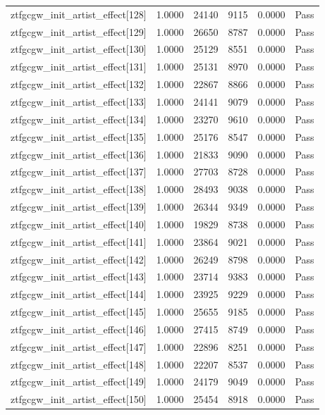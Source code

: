 \begin{table}[htbp]
\begin{tabular}{llrrll}
ztfgcgw\_init\_artist\_effect[128] & 1.0000 & 24140 & 9115 & 0.0000 & Pass \\
ztfgcgw\_init\_artist\_effect[129] & 1.0000 & 26650 & 8787 & 0.0000 & Pass \\
ztfgcgw\_init\_artist\_effect[130] & 1.0000 & 25129 & 8551 & 0.0000 & Pass \\
ztfgcgw\_init\_artist\_effect[131] & 1.0000 & 25131 & 8970 & 0.0000 & Pass \\
ztfgcgw\_init\_artist\_effect[132] & 1.0000 & 22867 & 8866 & 0.0000 & Pass \\
ztfgcgw\_init\_artist\_effect[133] & 1.0000 & 24141 & 9079 & 0.0000 & Pass \\
ztfgcgw\_init\_artist\_effect[134] & 1.0000 & 23270 & 9610 & 0.0000 & Pass \\
ztfgcgw\_init\_artist\_effect[135] & 1.0000 & 25176 & 8547 & 0.0000 & Pass \\
ztfgcgw\_init\_artist\_effect[136] & 1.0000 & 21833 & 9090 & 0.0000 & Pass \\
ztfgcgw\_init\_artist\_effect[137] & 1.0000 & 27703 & 8728 & 0.0000 & Pass \\
ztfgcgw\_init\_artist\_effect[138] & 1.0000 & 28493 & 9038 & 0.0000 & Pass \\
ztfgcgw\_init\_artist\_effect[139] & 1.0000 & 26344 & 9349 & 0.0000 & Pass \\
ztfgcgw\_init\_artist\_effect[140] & 1.0000 & 19829 & 8738 & 0.0000 & Pass \\
ztfgcgw\_init\_artist\_effect[141] & 1.0000 & 23864 & 9021 & 0.0000 & Pass \\
ztfgcgw\_init\_artist\_effect[142] & 1.0000 & 26249 & 8798 & 0.0000 & Pass \\
ztfgcgw\_init\_artist\_effect[143] & 1.0000 & 23714 & 9383 & 0.0000 & Pass \\
ztfgcgw\_init\_artist\_effect[144] & 1.0000 & 23925 & 9229 & 0.0000 & Pass \\
ztfgcgw\_init\_artist\_effect[145] & 1.0000 & 25655 & 9185 & 0.0000 & Pass \\
ztfgcgw\_init\_artist\_effect[146] & 1.0000 & 27415 & 8749 & 0.0000 & Pass \\
ztfgcgw\_init\_artist\_effect[147] & 1.0000 & 22896 & 8251 & 0.0000 & Pass \\
ztfgcgw\_init\_artist\_effect[148] & 1.0000 & 22207 & 8537 & 0.0000 & Pass \\
ztfgcgw\_init\_artist\_effect[149] & 1.0000 & 24179 & 9049 & 0.0000 & Pass \\
ztfgcgw\_init\_artist\_effect[150] & 1.0000 & 25454 & 8918 & 0.0000 & Pass \\

\end{tabular}
\end{table}
